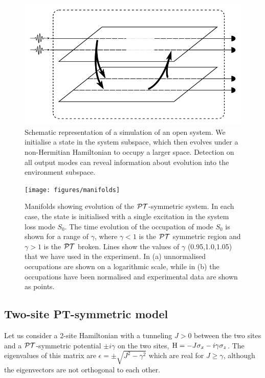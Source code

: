 \begin{figure}[t]
  \centering
  \includegraphics{figures/opensystem}
  \caption[Representation of an open system]
  {Schematic representation of a simulation of an open system. We initialise a
  state in the system subspace, which then evolves under a non-Hermitian
  Hamiltonian to occupy a larger space. Detection on all output modes can reveal
  information about evolution into the environment subspace.}
  \label{fig:opensystem}
\end{figure}

\begin{figure}[t]
  \centering
  \texttt{[image: figures/manifolds]}
  \caption[Manifolds showing evolution of the PT-symmetric system]
  {Manifolds showing evolution of the \(\mathcal{PT}{}\)-symmetric system. In each case,
  the state is initialised with a single excitation in the system loss mode
  \(S_{0}\). The time evolution of the occupation of mode \(S_{0}\) is shown
  for a range of \(\gamma\), where \(\gamma < 1\) is the \(\mathcal{PT}\) symmetric
  region and \(\gamma > 1\) is the \(\mathcal{PT}\) broken. Lines show the values of
  \(\gamma\) (0.95,1.0,1.05) that we have used in the experiment. In (a)
  unnormalised occupations are shown on a logarithmic scale, while in (b) the
  occupations have been normalised and experimental data are shown as points.}
  \label{fig:manifolds}
\end{figure}

\subsection{Two-site PT-symmetric model}
Let us consider a 2-site Hamiltonian with a tunneling \(J > 0\) between the two
sites and a \(\mathcal{PT}{}\)-symmetric potential \(\pm i \gamma\) on the two sites, \(
\mathrm{H} = -J \sigma_x -i \gamma \sigma_z\). The eigenvalues of this matrix are
\( \epsilon = \pm \sqrt{J^{2} - \gamma^{2}} \) which are real for \( J \geq
\gamma \), although the eigenvectors are not orthogonal to each other.

